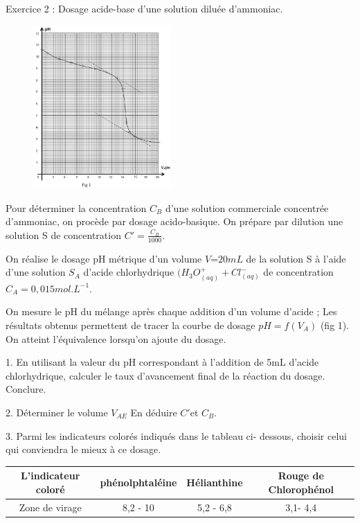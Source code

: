 \documentclass[12pt, french]{article}
\begin{document}
\begin{Box2}{Exercice 2 : Dosage acide-base d’une
solution diluée d’ammoniac.}
\begin{figure}
  \begin{center}
	  \vspace{-0.6cm}
	\includegraphics[width=0.47\textwidth]{./img/Dosage_01_00.png}
  \end{center}
\end{figure}
Pour déterminer la concentration $C_B$ d’une solution
commerciale concentrée d’ammoniac, on procède
par dosage acido-basique. On prépare par dilution une solution S de concentration $C' = \frac{C_B}{1000}$.

On réalise le dosage pH métrique d’un volume $V $=$20 mL$ de la solution S à l’aide d’une solution $S_A$ d’acide chlorhydrique $(H_3O^+_{(aq)} + Cl^-_{(aq)}$ de concentration $C_A = 0,015mol.L^{-1}$.

On mesure le pH du mélange après chaque addition
d’un volume d’acide ; Les résultats obtenus
permettent de tracer la courbe de dosage $pH = f(V_A)$
(fig 1). On atteint l’équivalence lorsqu’on ajoute du
dosage.

1. En utilisant la valeur du pH correspondant à
l’addition de 5mL d’acide chlorhydrique,
calculer le taux d’avancement final de la
réaction du dosage. Conclure.

2. Déterminer le volume $V_{AE}$ En déduire $C'$et $C_B$.

3. Parmi les indicateurs colorés indiqués dans le tableau ci-
dessous, choisir celui qui conviendra le mieux à ce dosage.

\begin{center}
\begin{tabular}{ |c||c|c|c| } 
 \hline
 L'indicateur coloré & phénolphtaléine& Hélianthine &Rouge de Chlorophénol  \\\hline 
 Zone de virage		 & 8,2 - 10		   &  5,2 - 6,8 & 3,1- 4,4 \\  
 \hline
\end{tabular}
\end{center}

\end{Box2}
\end{document}
